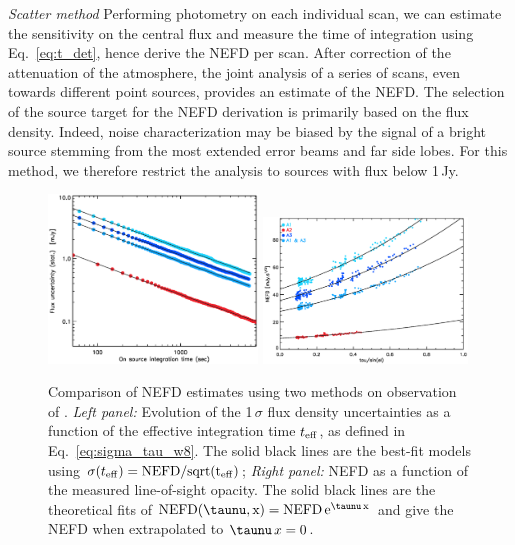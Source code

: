\noindent \emph{Scatter method} Performing photometry on each individual scan,
we can estimate the sensitivity on the central flux and measure the time of
integration using Eq.~\ref{eq:t_det}, hence derive the NEFD per
scan. After correction of the attenuation of the atmosphere, the joint
analysis of a series of scans, even towards different point sources, provides 
an estimate of the NEFD. The selection of the source target
for the NEFD derivation is primarily based on the flux density. Indeed, noise
characterization may be biased {\lp by the signal of a bright source
stemming from the most extended error beams and far side lobes.}
For this method, we therefore restrict the
analysis to sources with flux below 1\,Jy.

\begin{figure}[!thbp]
  \begin{center}
    \includegraphics[trim={0.5cm, 0, 0, 0.5cm}, clip, angle=0, width=0.495\textwidth]{Figures/hls_nefd_vst.eps}
    \includegraphics[trim={0.5cm, 0, 0.2cm, 0.5cm}, clip, angle=0, width=0.485\textwidth]{Figures/hls_NEFD_vs_TauElev_all.eps}
    \caption{Comparison of NEFD estimates using two methods on
      observation of \hls. \emph{Left panel:} Evolution of the
    1\,$\sigma$ flux density uncertainties as a function of the effective
    integration time $t_{\rm{eff}}$, as defined in
    Eq.~\ref{eq:sigma_tau_w8}. The solid black lines are the best-fit models using
    $\sigma(t_{\rm{eff}}) = \rm{NEFD}/sqrt(t_{\rm{eff}})$;
    \emph{Right panel:} NEFD as a function
    of the measured line-of-sight opacity. The solid black lines are the
    theoretical fits of
    $\rm{NEFD}(\taunu, x) = \rm{NEFD}\, e^{\taunu\,x}$
    and give the NEFD when extrapolated
    to $\taunu\,x = 0$. }
    \label{fig:nefd_twomethods}
  \end{center}
\end{figure}


